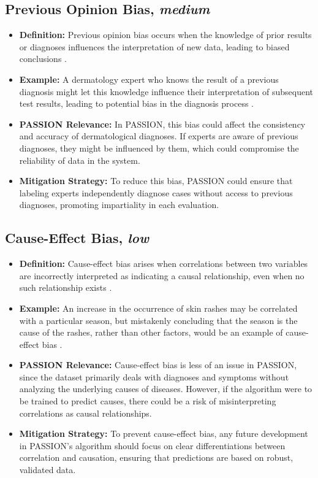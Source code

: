 \begin{refsection}
		\subsection{Previous Opinion Bias, \textit{medium}}
		\begin{itemize}
			\item \textbf{Definition:} Previous opinion bias occurs when the knowledge of prior results or diagnoses influences the interpretation of new data, leading to biased conclusions \autocite{Chakraborty_2024}.
			\item \textbf{Example:} A dermatology expert who knows the result of a previous diagnosis might let this knowledge influence their interpretation of subsequent test results, leading to potential bias in the diagnosis process \autocite{Chakraborty_2024}.
			\item \textbf{PASSION Relevance:} In PASSION, this bias could affect the consistency and accuracy of dermatological diagnoses. If experts are aware of previous diagnoses, they might be influenced by them, which could compromise the reliability of data in the system.
			\item \textbf{Mitigation Strategy:} To reduce this bias, PASSION could ensure that labeling experts independently diagnose cases without access to previous diagnoses, promoting impartiality in each evaluation.
		\end{itemize}
		
		\subsection{Cause-Effect Bias, \textit{low}}
		\begin{itemize}
			\item \textbf{Definition:} Cause-effect bias arises when correlations between two variables are incorrectly interpreted as indicating a causal relationship, even when no such relationship exists \autocite{Mester_2017}.
			\item \textbf{Example:} An increase in the occurrence of skin rashes may be correlated with a particular season, but mistakenly concluding that the season is the cause of the rashes, rather than other factors, would be an example of cause-effect bias \autocite{Mester_2017}.
			\item \textbf{PASSION Relevance:} Cause-effect bias is less of an issue in PASSION, since the dataset primarily deals with diagnoses and symptoms without analyzing the underlying causes of diseases. However, if the algorithm were to be trained to predict causes, there could be a risk of misinterpreting correlations as causal relationships.
			\item \textbf{Mitigation Strategy:} To prevent cause-effect bias, any future development in PASSION's algorithm should focus on clear differentiations between correlation and causation, ensuring that predictions are based on robust, validated data.
		\end{itemize}
		

\end{refsection}
